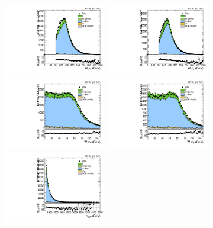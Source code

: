 \begin{figure}[htbp]
  \centering
  \includegraphics[width=0.4\textwidth]{fig/controlPlots/SB_b1_mu_allP_allC_allD_Run2_lnujj_l1_pt.pdf}
  \includegraphics[width=0.4\textwidth]{fig/controlPlots/SB_b1_e_allP_allC_allD_Run2_lnujj_l1_pt.pdf}\\
  \includegraphics[width=0.4\textwidth]{fig/controlPlots/SB_b1_mu_allP_allC_allD_Run2_lnujj_l1_mt.pdf}
  \includegraphics[width=0.4\textwidth]{fig/controlPlots/SB_b1_e_allP_allC_allD_Run2_lnujj_l1_mt.pdf}\\
  \includegraphics[width=0.4\textwidth]{fig/controlPlots/SB_b1_mu_allP_allC_allD_Run2_mWV.pdf}

\end{figure}
